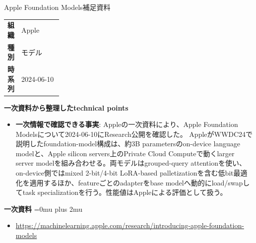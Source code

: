 \begin{technicalnote}{Apple Foundation Models}{補足資料}
\begingroup
\begin{tabularx}{\linewidth}{@{}>{\bfseries}p{0.22\linewidth}X@{}}
組織 & Apple \\
種別 & モデル \\
時系列 & 2024-06-10 \\
\end{tabularx}
\smallskip
{\bfseries 一次資料から整理したtechnical points}
\begin{itemize}[leftmargin=1.5em,itemsep=0.35em]
\item \textbf{一次情報で確認できる事実}: Appleの一次資料により、Apple Foundation Modelsについて2024-06-10にResearch公開を確認した。 AppleがWWDC24で説明したfoundation-model構成は、約3B parametersのon-device language modelと、Apple silicon servers上のPrivate Cloud Computeで動くlarger server modelを組み合わせる。両モデルはgrouped-query attentionを使い、on-device側ではmixed 2-bit/4-bit LoRA-based palletizationを含む低bit最適化を適用するほか、featureごとのadapterをbase modelへ動的にload/swapしてtask specializationを行う。性能値はAppleによる評価として扱う。
\end{itemize}
\begin{minipage}{\linewidth}
\begin{samepage}
{\bfseries 一次資料}
\begingroup\sloppy
\Urlmuskip=0mu plus 2mu\relax
\begin{itemize}[leftmargin=1.5em,itemsep=0.25em]
\item {\scriptsize\url{https://machinelearning.apple.com/research/introducing-apple-foundation-models}}
\end{itemize}
\endgroup
\end{samepage}
\end{minipage}
\endgroup
\end{technicalnote}
\medskip

